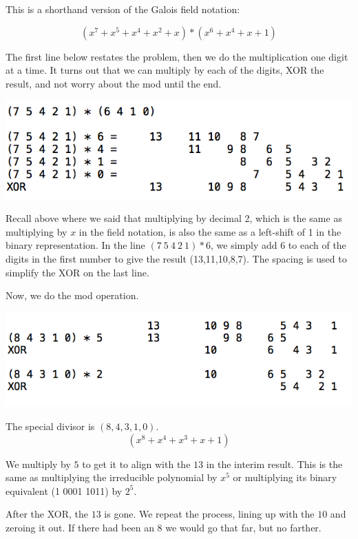 \documentclass[11pt, oneside]{article}
\begin{document}
This is a shorthand version of the Galois field notation:

\[ (x^7 + x^5 + x^4 + x^2 + x) * (x^6 + x^4 + x + 1) \]

The first line below restates the problem, then we do the multiplication one digit at a time.  It turns out that we can multiply by each of the digits, XOR the result, and not worry about the mod until the end.

\begin{center} \includegraphics [scale=0.6] {figs/GFmath1.png} \end{center}

Recall above where we said that multiplying by decimal 2, which is the same as multiplying by $x$ in the field notation, is also the same as a left-shift of 1 in the binary representation.  In the line $(7 \ 5 \ 4 \ 2 \ 1) * 6$, we simply add $6$ to each of the digits in the first number to give the result (13,11,10,8,7).  The spacing is used to simplify the XOR on the last line.

Now, we do the mod operation.
\begin{center} \includegraphics [scale=0.6] {figs/GFmath2.png} \end{center}
The special divisor is $(8,4,3,1,0)$. 
\[ (x^8 + x^4 + x^3 + x + 1) \]

We multiply by $5$ to get it to align with the $13$ in the interim result.  This is the same as multiplying the irreducible polynomial by $x^5$ or multiplying its binary equivalent (1 0001 1011) by $2^5$.

After the XOR, the $13$ is gone.  We repeat the process, lining up with the $10$ and zeroing it out.  If there had been an $8$ we would go that far, but no farther.
\end{document}
